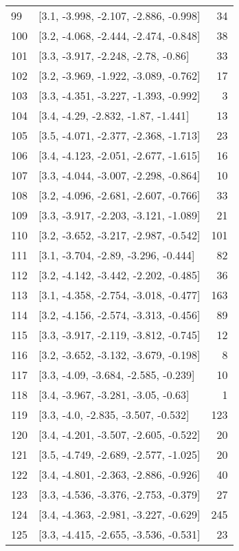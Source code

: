 \documentclass{article}%
\begin{document}
\begin{longtable}{llr}
99  &  [3.1, -3.998, -2.107, -2.886, -0.998] &      34 \\
100 &  [3.2, -4.068, -2.444, -2.474, -0.848] &      38 \\
101 &    [3.3, -3.917, -2.248, -2.78, -0.86] &      33 \\
102 &  [3.2, -3.969, -1.922, -3.089, -0.762] &      17 \\
103 &  [3.3, -4.351, -3.227, -1.393, -0.992] &       3 \\
104 &    [3.4, -4.29, -2.832, -1.87, -1.441] &      13 \\
105 &  [3.5, -4.071, -2.377, -2.368, -1.713] &      23 \\
106 &  [3.4, -4.123, -2.051, -2.677, -1.615] &      16 \\
107 &  [3.3, -4.044, -3.007, -2.298, -0.864] &      10 \\
108 &  [3.2, -4.096, -2.681, -2.607, -0.766] &      33 \\
109 &  [3.3, -3.917, -2.203, -3.121, -1.089] &      21 \\
110 &  [3.2, -3.652, -3.217, -2.987, -0.542] &     101 \\
111 &   [3.1, -3.704, -2.89, -3.296, -0.444] &      82 \\
112 &  [3.2, -4.142, -3.442, -2.202, -0.485] &      36 \\
113 &  [3.1, -4.358, -2.754, -3.018, -0.477] &     163 \\
114 &  [3.2, -4.156, -2.574, -3.313, -0.456] &      89 \\
115 &  [3.3, -3.917, -2.119, -3.812, -0.745] &      12 \\
116 &  [3.2, -3.652, -3.132, -3.679, -0.198] &       8 \\
117 &   [3.3, -4.09, -3.684, -2.585, -0.239] &      10 \\
118 &    [3.4, -3.967, -3.281, -3.05, -0.63] &       1 \\
119 &    [3.3, -4.0, -2.835, -3.507, -0.532] &     123 \\
120 &  [3.4, -4.201, -3.507, -2.605, -0.522] &      20 \\
121 &  [3.5, -4.749, -2.689, -2.577, -1.025] &      20 \\
122 &  [3.4, -4.801, -2.363, -2.886, -0.926] &      40 \\
123 &  [3.3, -4.536, -3.376, -2.753, -0.379] &      27 \\
124 &  [3.4, -4.363, -2.981, -3.227, -0.629] &     245 \\
125 &  [3.3, -4.415, -2.655, -3.536, -0.531] &      23 \\

\end{longtable}
\end{document}

